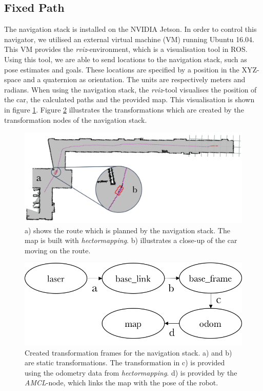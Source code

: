 \documentclass[conference,a4paper]{IEEEtran}
\begin{document}
\subsection{Fixed Path}
The navigation stack is installed on the NVIDIA Jetson. In order to control this navigator, we utilised an external virtual machine (VM) running Ubuntu 16.04. This VM provides the \emph{rviz}-environment, which is a visualisation tool in ROS. Using this tool, we are able to send locations to the navigation stack, such as pose estimates and goals. These locations are specified by a position in the XYZ-space and a quaternion as orientation. The units are respectively meters and radians. When using the navigation stack, the \emph{rviz}-tool visualises the position of the car, the calculated paths and the provided map. This visualisation is shown in figure \ref{fig:navstack_result}.
Figure \ref{fig:navstack_tf} illustrates the transformations which are created by the transformation nodes of the navigation stack.

\begin{figure}[!t]
	\includegraphics[width=\columnwidth]{navstack_result_1}
	\centering
	\caption{a) shows the route which is planned by the navigation stack. The map is built with \emph{hector\textunderscore mapping}\cite{Kohlbrecher2012}. b) illustrates a close-up of the car moving on the route. }
	\label{fig:navstack_result}
\end{figure}

\begin{figure}[!t]
	\includegraphics[width=\columnwidth]{navstack_tf2}
	\centering
	\caption{Created transformation frames for the navigation stack. a) and b) are static transformations. The transformation in c) is provided using the odometry data from \emph{hector\textunderscore mapping}. d) is provided by the \emph{AMCL}-node, which links the map with the pose of the robot.}
	\label{fig:navstack_tf}
\end{figure}
\end{document}
